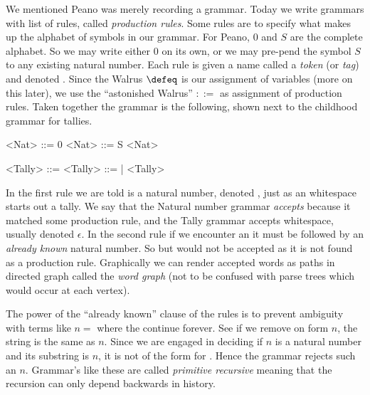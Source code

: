 We mentioned Peano was merely recording a grammar.  Today we write grammars with 
list of rules, called \emph{production rules}.  Some rules are to specify 
what makes up the alphabet of symbols in our grammar.  For Peano, $0$ and $S$
are the complete alphabet.  So we may write either $0$ on its own, or 
we may pre-pend the symbol $S$ to any existing natural number.  
Each rule is given a name called a \emph{token} (or \emph{tag}) and 
denoted . Since the Walrus
$\defeq$ is our assignment of variables (more on this later), 
we use the ``astonished Walrus'' $::=$
as assignment of production rules.   Taken together the grammar is the following,
shown next to the childhood grammar for tallies.
\begin{center}
\begin{minipage}{0.4\textwidth}
\begin{gcode}[]
<Nat> ::= 0 
<Nat> ::= S <Nat>
\end{gcode}
\end{minipage}
\hfill
\begin{minipage}{0.45\textwidth}
\begin{gcode}[]
<Tally> ::=  
<Tally> ::= | <Tally>
\end{gcode}
\end{minipage}
\end{center}
In the first rule we are told  is a natural number, denoted
, just as an whitespace starts out a tally. We say that the Natural
number grammar \emph{accepts}  because it matched some production rule,
and the Tally grammar accepts whitespace, usually denoted $\epsilon$.  In the second rule if we encounter an
 it must be followed by an \emph{already known} natural number.  So
 but  would not be accepted as it is not found as a
production rule.
Graphically we can render accepted words as paths in directed graph called 
the \emph{word graph} (not to be confused with parse trees which would occur at each vertex).
\begin{center}
\end{center}

\begin{remark}
    The power of the ``already known'' clause of the rules is to prevent ambiguity 
    with terms like $n=$ where the  continue forever.
    See if we remove on  form $n$, the string is the same as $n$.
    Since we are engaged in deciding if $n$ is a natural number and its substring 
    is $n$, it is not of the form  for .  Hence the grammar 
    rejects such an $n$.  Grammar's like these are called \emph{primitive recursive}
    meaning that the recursion can only depend backwards 
    in history.
\end{remark}

